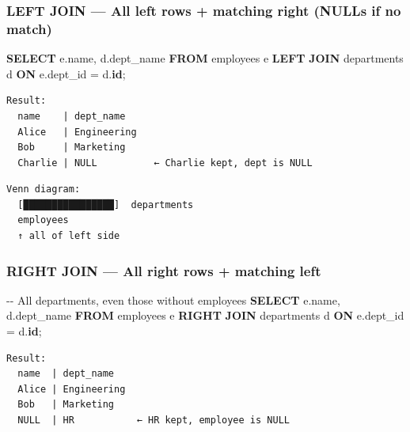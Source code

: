 \documentclass[11pt]{article}
\newenvironment{Shaded}{\begin{snugshade}}{\end{snugshade}}
\newcommand{\CommentTok}[1]{\textcolor[rgb]{0.48,0.49,0.49}{#1}}
\newcommand{\KeywordTok}[1]{\textcolor[rgb]{0.81,0.81,0.76}{\textbf{#1}}}
\newcommand{\NormalTok}[1]{\textcolor[rgb]{0.81,0.81,0.76}{#1}}
\newcommand{\OperatorTok}[1]{\textcolor[rgb]{0.81,0.81,0.76}{#1}}
\begin{document}
\subsubsection{LEFT JOIN --- All left rows + matching right (NULLs if no match)}\label{left-join--all-left-rows--matching-right-nulls-if-no-match}


\begin{Shaded}
\begin{Highlighting}[]
\KeywordTok{SELECT}\NormalTok{ e.name, d.dept\_name}
\KeywordTok{FROM}\NormalTok{ employees e}
\KeywordTok{LEFT} \KeywordTok{JOIN}\NormalTok{ departments d }\KeywordTok{ON}\NormalTok{ e.dept\_id }\OperatorTok{=}\NormalTok{ d.}\KeywordTok{id}\NormalTok{;}
\end{Highlighting}
\end{Shaded}

\setcodelang{}

\begin{verbatim}
Result:
  name    | dept_name
  Alice   | Engineering
  Bob     | Marketing
  Charlie | NULL          ← Charlie kept, dept is NULL
\end{verbatim}

\setcodelang{}

\begin{verbatim}
Venn diagram:
  [████████████████]  departments
  employees
  ↑ all of left side
\end{verbatim}

\subsubsection{RIGHT JOIN --- All right rows + matching left}\label{right-join--all-right-rows--matching-left}


\begin{Shaded}
\begin{Highlighting}[]
\CommentTok{{-}{-} All departments, even those without employees}
\KeywordTok{SELECT}\NormalTok{ e.name, d.dept\_name}
\KeywordTok{FROM}\NormalTok{ employees e}
\KeywordTok{RIGHT} \KeywordTok{JOIN}\NormalTok{ departments d }\KeywordTok{ON}\NormalTok{ e.dept\_id }\OperatorTok{=}\NormalTok{ d.}\KeywordTok{id}\NormalTok{;}
\end{Highlighting}
\end{Shaded}

\setcodelang{}

\begin{verbatim}
Result:
  name  | dept_name
  Alice | Engineering
  Bob   | Marketing
  NULL  | HR           ← HR kept, employee is NULL
\end{verbatim}
\end{document}
